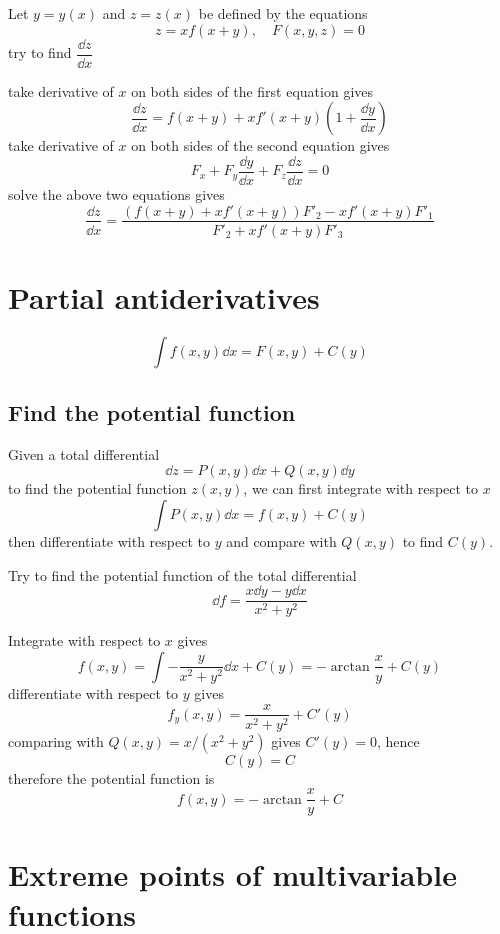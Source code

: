 \documentclass[a4]{overview}
\begin{document}
\begin{example}
	Let $y=y(x)$ and $z=z(x)$ be defined by the equations
	\[
	z = x f(x+y),\quad F(x,y,z)=0
	\] 
	try to find $\dfrac{\dd z}{\dd x}$
	\begin{answer}
		take derivative of $x$ on both sides of the first equation gives
		\[
			\frac{\dd z}{\dd x} = f(x+y) + x f'(x+y)\left(1+\frac{\dd y}{\dd x}\right)
		\]
		take derivative of $x$ on both sides of the second equation gives
		\[
			F_x + F_y \frac{\dd y}{\dd x} + F_z \frac{\dd z}{\dd x} = 0
		\] 
		solve the above two equations gives
		\[
			\frac{\dd z}{\dd x} = \frac{(f(x+y) + x f'(x+y))F'_2 - x f'(x+y) F'_1}
			{F'_2 + x f'(x+y) F'_3}
		\] 
		
	\end{answer}
	
\end{example}

\section{Partial antiderivatives}

\[
\int f(x,y) \dd x = F(x,y) + C(y)
\] 

\subsection{Find the potential function}
Given a total differential
\[
\dd z = P(x,y) \dd x + Q(x,y) \dd y
\] 
to find the potential function $z(x,y)$, we can first integrate with respect to $x$ 
\[
\int P(x,y) \dd x = f(x,y) + C(y)
\] 
then differentiate with respect to $y$ and compare with $Q(x,y)$ to find $C(y)$.

\begin{example}
	Try to find the potential function of the total differential
	\[
		\dd f = \frac{x \dd y - y \dd x}{x^2+y^2}
	\] 
	\begin{answer}
		Integrate with respect to $x$ gives
		\[
			f(x,y) = \int -\frac{y}{x^2+y^2} \dd x + C(y)
			= -\arctan\frac{x}{y} + C(y)
		\] 
		differentiate with respect to $y$ gives
		\[
			f_y(x,y) = \frac{x}{x^2+y^2} + C'(y)
		\] 
		comparing with $Q(x,y) = {x}/{(x^2+y^2)}$ gives $C'(y)=0$, hence
		\[
			C(y) = C
		\]
		therefore the potential function is
		\[
			f(x,y) = -\arctan\frac{x}{y} + C
		\]
	\end{answer}
\end{example}

\section{Extreme points of multivariable functions}
\end{document}

